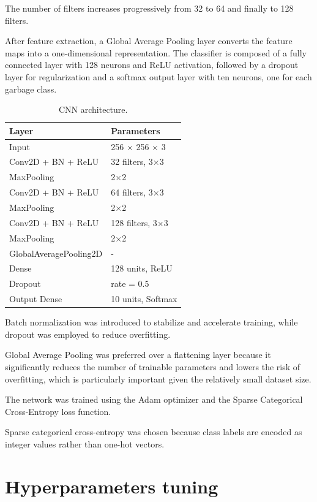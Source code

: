 \documentclass{article}
\begin{document}
The number of filters increases progressively from 32 to 64 and
finally to 128 filters.

After feature extraction, a Global Average Pooling layer converts the
feature maps into a one-dimensional representation. The classifier is
composed of a fully connected layer with 128 neurons and ReLU
activation, followed by a dropout layer for regularization and a
softmax output layer with ten neurons, one for each garbage class.

\begin{table}[h]
\centering
\caption{CNN architecture.}
\begin{tabular}{ll}
\hline
Layer & Parameters \\
\hline
Input & 256 × 256 × 3 \\
Conv2D + BN + ReLU & 32 filters, 3×3 \\
MaxPooling & 2×2 \\
Conv2D + BN + ReLU & 64 filters, 3×3 \\
MaxPooling & 2×2 \\
Conv2D + BN + ReLU & 128 filters, 3×3 \\
MaxPooling & 2×2 \\
GlobalAveragePooling2D & - \\
Dense & 128 units, ReLU \\
Dropout & rate = 0.5 \\
Output Dense & 10 units, Softmax \\
\hline
\end{tabular}
\end{table}

Batch normalization was introduced to stabilize and accelerate
training, while dropout was employed to reduce overfitting.

Global Average Pooling was preferred over a flattening layer because
it significantly reduces the number of trainable parameters and lowers
the risk of overfitting, which is particularly important given the
relatively small dataset size.

The network was trained using the Adam optimizer and the
Sparse Categorical Cross-Entropy loss function.

Sparse categorical cross-entropy was chosen because class labels are
encoded as integer values rather than one-hot vectors.


\section{Hyperparameters tuning}
\end{document}
